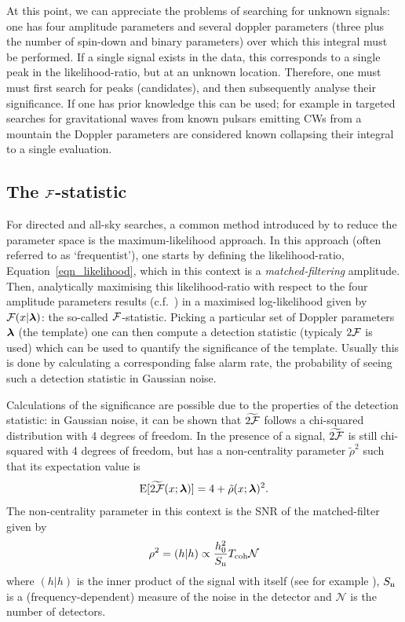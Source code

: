 \documentclass[aps, prd, twocolumn, superscriptaddress, floatfix, showpacs, nofootinbib, longbibliography]{revtex4-1}
\begin{document}
At this point, we can appreciate the problems of searching for unknown signals:
one has four amplitude parameters and several doppler parameters (three plus
the number of spin-down and binary parameters) over which this integral must be
performed. If a single signal exists in the data, this corresponds to a single
peak in the likelihood-ratio, but at an unknown location. Therefore, one must
must first search for peaks (candidates), and then subsequently analyse their
significance. If one has prior knowledge this can be used; for example in
targeted searches for gravitational waves from known pulsars emitting CWs from
a mountain the Doppler parameters are considered known collapsing their
integral to a single evaluation.

\subsection{The ${\mathcal{F}}$-statistic}

For directed and all-sky searches, a common method introduced by
\citet{jks1998} to reduce the parameter space is the maximum-likelihood
approach. In this approach (often referred to as `frequentist'), one starts by
defining the likelihood-ratio, Equation~\eqref{eqn_likelihood}, which in this
context is a \emph{matched-filtering} amplitude. Then, analytically maximising
this likelihood-ratio with respect to the four amplitude parameters results
(c.f.~\citet{prix2009}) in a maximised log-likelihood given by ${\mathcal{F}}(x|
\boldsymbol{\mathbf{\lambda}})$: the so-called ${\mathcal{F}}$-statistic. Picking a particular set of Doppler
parameters $\boldsymbol{\mathbf{\lambda}}$ (the template) one can then compute a detection statistic
(typicaly $2{\mathcal{F}}$ is used) which can be used to quantify the significance of the
template. Usually this is done by calculating a corresponding false alarm rate,
the probability of seeing such a detection statistic in Gaussian noise.

Calculations of the significance are possible due to the properties of the
detection statistic: in Gaussian noise, it can be shown \citep{jks1998,
cutlershutz2005} that $\widetilde{2{\mathcal{F}}}$ follows a chi-squared distribution with
4 degrees of freedom. In the presence of a signal, $\widetilde{2{\mathcal{F}}}$ is
still chi-squared with 4 degrees of freedom, but has a non-centrality parameter
$\tilde{\rho}^{2}$ such that its expectation value is
\begin{equation}
\textrm{E}[\widetilde{2{\mathcal{F}}}(x; \boldsymbol{\mathbf{\lambda}})] = 4 + \tilde{\rho}(x; \boldsymbol{\mathbf{\lambda}})^2.
\label{eqn_twoF_expectation}
\end{equation}
The non-centrality parameter in this context is the SNR of the matched-filter
given by
\begin{equation}
\rho^{2} = (h | h) \propto \frac{h_0^2}{S_{\rm n}}T_{\rm coh} \mathcal{N}
\end{equation}
where $(h|h)$ is the inner product of the signal with itself (see for example
\citet{prix2009}), $S_{\rm n}$ is a (frequency-dependent) measure of the noise in
the detector and $\mathcal{N}$ is the number of detectors.
\end{document}

